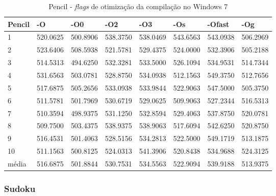 \begin{apendicesenv}
\begin{table}[!ht]
\centering
\tiny
\caption{Pencil - \textit{flags} de otimização da compilação no Windows 7}
\label{tab:otimizacao_compilacao:windows:pencil}
\begin{tabular}{llllllll}
\textbf{Pencil}    & \textbf{-O}  & \textbf{-O0}   & \textbf{-O2} & \textbf{-O3} & \textbf{-Os} & \textbf{-Ofast} & \textbf{-Og} \\ \toprule
1                  & 520.0625     &   500.8906     &    538.3750  &    538.0469  &    543.6563  &   543.0938      &   506.2969       \\ 
2                  & 523.6406     &   508.5938     &    521.5781  &    529.4375  &    524.0000  &   532.3906      &   505.2188       \\ 
3                  & 514.5313     &   494.6250     &    532.3281  &    533.5000  &    526.1094  &   534.9531      &   514.7344       \\ 
4                  & 531.6563     &   503.0781     &    528.8750  &    534.0938  &    512.1563  &   549.3750      &   512.7656       \\ 
5                  & 517.6875     &   505.2656     &    533.0938  &    533.9844  &    522.9063  &   547.5000      &   505.3750       \\ 
6                  & 511.5781     &   501.7969     &    530.6719  &    529.0625  &    509.9063  &   527.2344      &   516.5313       \\ 
7                  & 510.3594     &   498.9375     &    531.1250  &    532.8594  &    529.4063  &   537.8750      &   520.0781       \\ 
8                  & 509.7500     &   503.4375     &    538.9375  &    538.9063  &    517.6094  &   542.6250      &   520.8750       \\ 
9                  & 516.4531     &   501.4063     &    528.5156  &    534.2813  &    522.5000  &   549.1719      &   513.1875       \\ 
10                 & 511.1563     &   500.8125     &    524.0313  &    541.3906  &    520.8438  &   534.9688      &   524.3125       \\ \bottomrule
média              & 516.6875     &   501.8844     &    530.7531  &    534.5563  &    522.9094  &   539.9188      &   513.9375       \\ 
\end{tabular}
\end{table}


\clearpage
\subsubsection*{Sudoku}


\end{apendicesenv}
